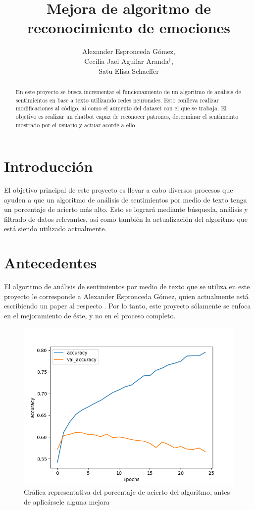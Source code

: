\documentclass[a4]{sciposter}
\title{Mejora de algoritmo de\\reconocimiento de emociones}
\author{Alexander Espronceda Gómez,\\Cecilia Jael Aguilar Aranda$^\dagger$,\\Satu Elisa Schaeffer}
\institute {Posgrado en Ingeniería de Sistemas}
\begin{document}

\maketitle

\begin{abstract}
En este proyecto se busca incrementar el funcionamiento de un algoritmo de análisis de sentimientos en base a texto utilizando redes neuronales. Esto conlleva realizar modificaciones al código, aí como el aumento del dataset con el que se trabaja. El objetivo es realizar un chatbot capaz de reconocer patrones, determinar el sentimeinto mostrado por el usuario y actuar acorde a ello.
\end{abstract}

\begin{multicols}{2} 

\section{Introducción}

El objetivo principal de este proyecto es llevar a cabo diversos procesos que ayuden a que un algoritmo de análisis de sentimientos por medio de texto tenga un porcentaje de acierto más alto. Esto se logrará mediante búsqueda, análisis y filtrado de datos relevantes, así como también la actualización del algoritmo que está siendo utilizado actualmente.

\section{Antecedentes}

El algoritmo de análisis de sentimientos por medio de texto que se utiliza en este proyecto le corresponde a Alexander Espronceda Gómez, quien actualmente está escribiendo un paper al respecto \citep{chatbot}. Por lo tanto, este proyecto sólamente se enfoca en el mejoramiento de éste, y no en el proceso completo.
\begin{figure}
	\centering
	\captionsetup{type=figure}
	\setcounter{figure}{0}
	\includegraphics[scale=1.5]{img/Accuracy 2020-05_nofilter}
	\caption{Gráfica representativa del porcentaje de acierto del algoritmo, antes de aplicársele alguna mejora}
	

\end{figure}
\end{multicols}
\end{document}
